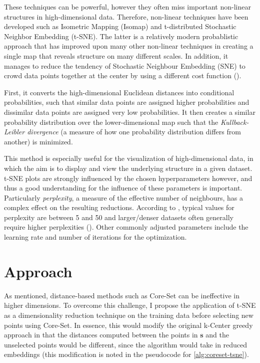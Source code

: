 \documentclass[english,bachelor,ul]{webisthesis} %
\begin{document}
These techniques can be powerful, however they often miss important non-linear structures in high-dimensional data. Therefore, non-linear techniques have been developed such as Isometric Mapping (Isomap) and t-distributed Stochastic Neighbor Embedding (t-SNE). The latter is a relatively modern probablistic approach that has improved upon many other non-linear techniques in creating a single map that reveals structure on many different scales. In addition, it manages to reduce the tendency of Stochastic Neighbour Embedding (SNE) to crowd data points together at the center by using a different cost function (\cite{van2008visualizing}). 

First, it converts the high-dimensional Euclidean distances into conditional probabilities, such that similar data points are assigned higher probabilities and dissimilar data points are assigned very low probabilities. It then creates a similar probability distribution over the lower-dimensional map such that the \textit{Kullback-Leibler divergence} (a measure of how one probability distribution differs from another) is minimized.

This method is especially useful for the visualization of high-dimensional data, in which the aim is to display and view the underlying structure in a given dataset. t-SNE plots are strongly influenced by the chosen hyperparameters however, and thus a good understanding for the influence of these parameters is important. Particularly \textit{perplexity}, a measure of the effective number of neighbours, has a complex effect on the resulting reductions. According to \cite{van2008visualizing}, typical values for perplexity are between 5 and 50 and larger/denser datasets often generally require higher perplexities (\cite{vanHomepage}). Other commonly adjusted parameters include the learning rate and number of iterations for the optimization.

\chapter{Approach}

As mentioned, distance-based methods such as Core-Set can be ineffective in higher dimensions. To overcome this challenge, I propose the application of t-SNE as a dimensionality reduction technique on the training data before selecting new points using Core-Set. In essence, this would modify the original k-Center greedy approach in that the distances computed between the points in $ \mathbf{s} $ and the unselected points would be different, since the algorithm would take in reduced embeddings (this modification is noted in the pseudocode for \ref{alg:coreset-tsne}).
\end{document}
